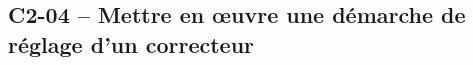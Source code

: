 \subsection{C2-04 -- Mettre en \oe{}uvre une démarche de réglage d’un correcteur}

\renewcommand{\repExo}{../../ExercicesCompetences/C2_MettreEnOeuvreDemarche/C2_04_Correcteurs}

\renewcommand{\td}{65_Eclipse}
\graphicspath{{\repStyle/png/}{\repExo/\td/images/}}


\renewcommand{\td}{65_Eclipse_02}
\graphicspath{{\repStyle/png/}{\repExo/\td/images/}}


\renewcommand{\td}{65_Eclipse_03}
\graphicspath{{\repStyle/png/}{\repExo/\td/images/}}


\renewcommand{\td}{66_Micromanipulateur}
\graphicspath{{\repStyle/png/}{\repExo/\td/images/}}


\renewcommand{\td}{67_PompeTurbo}
\graphicspath{{\repStyle/png/}{\repExo/\td/images/}}


\renewcommand{\td}{68_Roburoc}
\graphicspath{{\repStyle/png/}{\repExo/\td/images/}}

